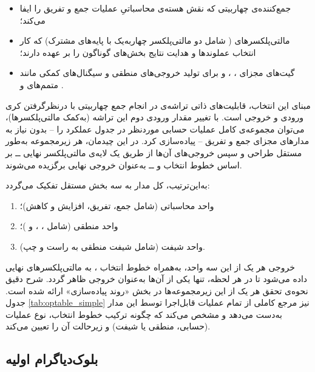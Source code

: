 \documentclass[a4paper,12pt]{article}
\numberwithin{figure}{subsection}
\begin{document}
\begin{itemize}[itemsep=2pt]
    \item جمع‌کننده‌ی چهاربیتی  که نقش هسته‌ی محاسباتیِ عملیات جمع و تفریق را ایفا می‌کند؛
    \item   مالتی‌پلکسرهای  ( شامل دو مالتی‌پلکسر چهار‌به‌یک با پایه‌های  مشترک) که کار انتخاب عملوندها و هدایت نتایج بخش‌های گوناگون را بر عهده دارند؛
    \item گیت‌های مجزای ، ،  و  برای تولید خروجی‌های منطقی و سیگنال‌های کمکی مانند متمم‌های  و .
\end{itemize}

مبنای این انتخاب، قابلیت‌های ذاتی تراشه‌ی  در انجام جمع چهاربیتی با درنظرگرفتن کری ورودی و خروجی است. با تغییر مقدار ورودی دوم این تراشه (به‌کمک مالتی‌پلکسرها)، می‌توان مجموعه‌ی کامل عملیات حسابی موردنظر در جدول عملکرد را -- بدون نیاز به مدارهای مجزای جمع و تفریق -- پیاده‌سازی کرد. در این چیدمان، هر زیرمجموعه به‌طور مستقل طراحی و سپس خروجی‌های آن‌ها از طریق یک لایه‌ی مالتی‌پلکسر نهایی ــ بر اساس خطوط انتخاب  و  ــ به‌عنوان خروجی نهایی  برگزیده می‌شوند.

به‌این‌ترتیب، کل مدار به سه بخش مستقل تفکیک می‌گردد:

\begin{enumerate}[itemsep=2pt]
    \item واحد محاسباتی (شامل جمع، تفریق، افزایش و کاهش)؛
    \item واحد منطقی (شامل ، ،  و )؛
    \item واحد شیفت (شامل شیفت منطقی به راست و چپ).
\end{enumerate}

خروجی هر یک از این سه واحد، به‌همراه خطوط انتخاب ، به مالتی‌پلکسرهای نهایی داده می‌شود تا در هر لحظه، تنها یکی از آن‌ها به‌عنوان خروجی  ظاهر گردد. شرح دقیق نحوه‌ی تحقق هر یک از این زیرمجموعه‌ها در بخش «روند پیاده‌سازی» ارائه شده است. جدول \ref{tab:optable_simple} نیز مرجع کاملی از تمام عملیات قابل‌اجرا توسط این مدار به‌دست می‌دهد و مشخص می‌کند که چگونه ترکیب خطوط انتخاب، نوع عملیات (حسابی، منطقی یا شیفت) و زیرحالت آن را تعیین می‌کند.

\newpage

\subsection{بلوک‌دیاگرام اولیه}
\leavevmode\par
\vspace{0.3cm}
\end{document}
